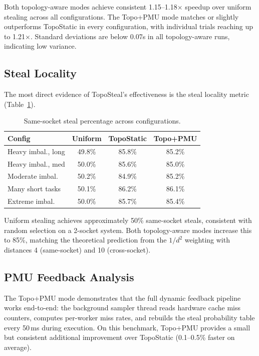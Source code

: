 \documentclass[conference]{IEEEtran}
\begin{document}
Both topology-aware modes achieve consistent 1.15--1.18$\times$ speedup over uniform stealing across all configurations. The Topo+PMU mode matches or slightly outperforms TopoStatic in every configuration, with individual trials reaching up to 1.21$\times$. Standard deviations are below 0.07s in all topology-aware runs, indicating low variance.

\subsection{Steal Locality}

The most direct evidence of TopoSteal's effectiveness is the steal locality metric (Table~\ref{tab:locality}).

\begin{table}[h]
\centering
\caption{Same-socket steal percentage across configurations.}
\begin{tabular}{lccc}
\toprule
\textbf{Config} & \textbf{Uniform} & \textbf{TopoStatic} & \textbf{Topo+PMU} \\
\midrule
Heavy imbal., long  & 49.8\% & 85.8\% & 85.2\% \\
Heavy imbal., med   & 50.0\% & 85.6\% & 85.0\% \\
Moderate imbal.     & 50.2\% & 84.9\% & 85.2\% \\
Many short tasks    & 50.1\% & 86.2\% & 86.1\% \\
Extreme imbal.      & 50.0\% & 85.7\% & 85.4\% \\
\bottomrule
\end{tabular}
\label{tab:locality}
\end{table}

Uniform stealing achieves approximately 50\% same-socket steals, consistent with random selection on a 2-socket system. Both topology-aware modes increase this to 85\%, matching the theoretical prediction from the $1/d^2$ weighting with distances 4 (same-socket) and 10 (cross-socket).

\subsection{PMU Feedback Analysis}

The Topo+PMU mode demonstrates that the full dynamic feedback pipeline works end-to-end: the background sampler thread reads hardware cache miss counters, computes per-worker miss rates, and rebuilds the steal probability table every 50\,ms during execution. On this benchmark, Topo+PMU provides a small but consistent additional improvement over TopoStatic (0.1--0.5\% faster on average).
\end{document}
